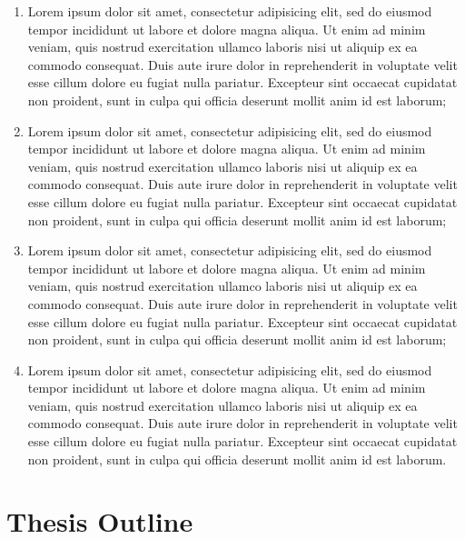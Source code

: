 \begin{enumerate}
  
  \item Lorem ipsum dolor sit amet, consectetur adipisicing elit, sed do eiusmod tempor incididunt ut labore et dolore magna aliqua. Ut enim ad minim veniam, quis nostrud exercitation ullamco laboris nisi ut aliquip ex ea commodo consequat. Duis aute irure dolor in reprehenderit in voluptate velit esse cillum dolore eu fugiat nulla pariatur. Excepteur sint occaecat cupidatat non proident, sunt in culpa qui officia deserunt mollit anim id est laborum;
  
  \item Lorem ipsum dolor sit amet, consectetur adipisicing elit, sed do eiusmod tempor incididunt ut labore et dolore magna aliqua. Ut enim ad minim veniam, quis nostrud exercitation ullamco laboris nisi ut aliquip ex ea commodo consequat. Duis aute irure dolor in reprehenderit in voluptate velit esse cillum dolore eu fugiat nulla pariatur. Excepteur sint occaecat cupidatat non proident, sunt in culpa qui officia deserunt mollit anim id est laborum;
  
  \item Lorem ipsum dolor sit amet, consectetur adipisicing elit, sed do eiusmod tempor incididunt ut labore et dolore magna aliqua. Ut enim ad minim veniam, quis nostrud exercitation ullamco laboris nisi ut aliquip ex ea commodo consequat. Duis aute irure dolor in reprehenderit in voluptate velit esse cillum dolore eu fugiat nulla pariatur. Excepteur sint occaecat cupidatat non proident, sunt in culpa qui officia deserunt mollit anim id est laborum;
  
  \item Lorem ipsum dolor sit amet, consectetur adipisicing elit, sed do eiusmod tempor incididunt ut labore et dolore magna aliqua. Ut enim ad minim veniam, quis nostrud exercitation ullamco laboris nisi ut aliquip ex ea commodo consequat. Duis aute irure dolor in reprehenderit in voluptate velit esse cillum dolore eu fugiat nulla pariatur. Excepteur sint occaecat cupidatat non proident, sunt in culpa qui officia deserunt mollit anim id est laborum.
  
\end{enumerate}

\section{Thesis Outline}\label{introduction:sec:thesis_outline}

